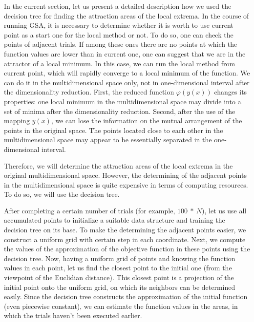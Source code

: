 \documentclass{svproc}
\begin{document}
In the current section, let us present a detailed description how we used the decision tree for finding  the attraction areas of the local extrema.  In the course of running GSA, it is necessary to determine whether it is worth to use current point as a  start one for the local method or not. To do so, one can check the points of adjacent trials. If among  these ones there are no points at which the function values are lower than in current one, one  can suggest that we are in the attractor of a local minimum. In this case, we can run the local method  from current point, which will rapidly converge to a local minimum of the function.  We can do it in the multidimensional space only, not in one-dimensional interval after the  dimensionality reduction.  First, the reduced function $\varphi(y(x))$ changes its properties: one local minimum in the  multidimensional space may divide into a set of minima after the dimensionality reduction.  Second, after the use of the mapping $y(x)$, we can lose the information on the mutual arrangement of  the points in the original space. The points located close to each other in the multidimensional space  may appear to be essentially separated in the one-dimensional interval.




Therefore, we will determine the attraction areas of the local extrema in the original multidimensional space. However, the determining of the adjacent points in the multidimensional space is quite expensive in terms of computing resources. To do so, we will use the decision tree. 

After completing a certain number of trials (for example, $100\ \ast\ N$), let us use all accumulated  points to initialize a suitable data structure and training the decision tree on its base. To make the  determining the adjacent points easier, we construct a uniform grid with certain step in each coordinate.  Next, we compute the values of the approximation of the objective function in these points  using the decision tree. Now, having a uniform grid of points and knowing the function values in each  point, let us find the closest point to the initial one (from the viewpoint of the Euclidian distance). This  closest point is a projection of the initial point onto the uniform grid, on which its neighbors can be  determined easily. Since the decision tree constructs the approximation of the initial function (even  piecewise constant), we can estimate the function values in the areas, in which the trials haven't been  executed earlier.
\end{document}
